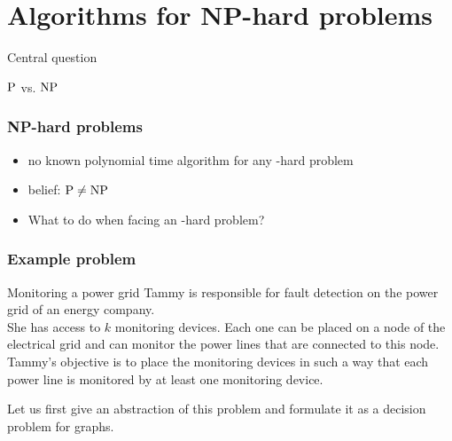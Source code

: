 
\newcommand{\mycomp}[1]{\pgfmathparse{#1}\pgfmathprintnumber[precision=0]{\pgfmathresult}}





\section{Algorithms for NP-hard problems}

\begin{frame}
	Central question
	\begin{center}
		{\huge $\P$ vs. $\NP$}
	\end{center}
\end{frame}

\begin{frame}
	\frametitle{NP-hard problems}

	\begin{itemize}
		\item no known polynomial time algorithm for any \NP-hard problem
		\item belief: $\P \neq \NP$
		\item What to do when facing an \NP-hard problem?
	\end{itemize}
\end{frame}


\begin{frame}
	\frametitle{Example problem}

	\begin{block}{Monitoring a power grid}
		Tammy is responsible for fault detection on the power grid of an energy company.\\\smallskip
		She has access to $k$ monitoring devices. Each one can be placed on a node of the electrical grid and can monitor the power lines that are connected to this node.\\\smallskip
		Tammy's objective is to place the monitoring devices in such a way that each power line is monitored by at least one monitoring device.
	\end{block}
	Let us first give an abstraction of this problem and formulate it as a decision problem for graphs.
\end{frame}


